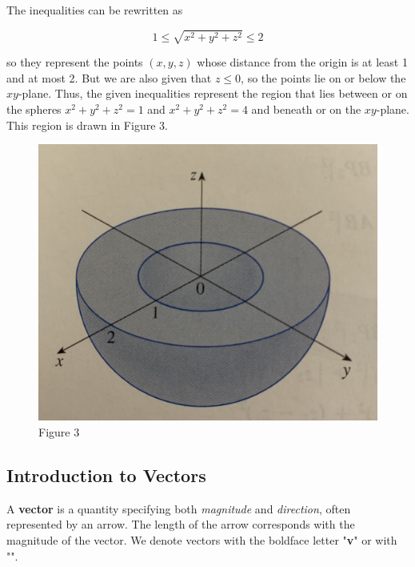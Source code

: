         \noindent The inequalities can be rewritten as

        \begin{equation*}
            1\leq\sqrt{x^2+y^2+z^2}\leq2
        \end{equation*}

        \noindent so they represent the points $(x,y,z)$ whose distance from the origin is at least 1 and
        at most 2. But we are also given that $z\leq0$, so the points lie on or below the
        $xy$-plane. Thus, the given inequalities represent the region that lies between or on
        the spheres $x^2+y^2+z^2=1$ and $x^2+y^2+z^2=4$ and beneath or on the $xy$-plane.
        This region is drawn in Figure 3.

        \begin{figure}[h]
            \centering
            \includegraphics[scale=0.1]{Resources/Unit3Vectors/Fig3.jpg}
            \caption*{Figure 3}
        \end{figure}



    \subsection{Introduction to Vectors}
        A \textbf{vector} is a quantity specifying both \emph{magnitude} and \emph{direction},
        often represented by an arrow. The length of the arrow corresponds with the magnitude
        of the vector. We denote vectors with the boldface letter "\textbf{v}" or with
        "". \\


